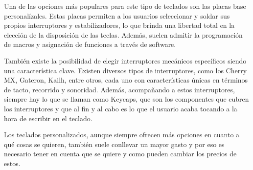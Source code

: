 Una de las opciones más populares para este tipo de teclados son las placas base personalízales. Estas placas permiten a los usuarios seleccionar y soldar sus propios interruptores y estabilizadores, lo que brinda una libertad total en la elección de la disposición de las teclas. Además, suelen admitir la programación de macros y asignación de funciones a través de software.

También existe la posibilidad de elegir interruptores mecánicos específicos siendo una característica clave. Existen diversos tipos de interruptores, como los Cherry MX, Gateron, Kailh, entre otros, cada uno con características únicas en términos de tacto, recorrido y sonoridad. Además, acompañando a estos interruptores, siempre hay lo que se llaman como \gls{Keycaps}, que son los componentes que cubren los interruptores y que al fin y al cabo es lo que el usuario acaba tocando a la hora de escribir en el teclado.

Los teclados personalizados, aunque siempre ofrecen más opciones en cuanto a qué cosas se quieren, también suele conllevar un mayor gasto y por eso es necesario tener en cuenta que se quiere y como pueden cambiar los precios de estos.

